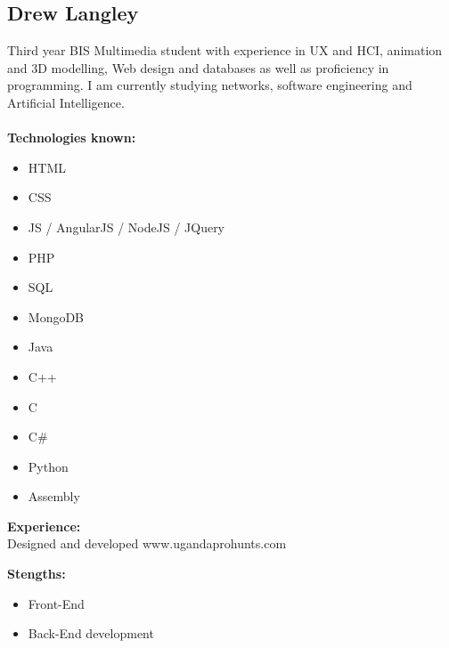 \documentclass{article}
\begin{document}
\subsection {Drew Langley}
Third year BIS Multimedia student with experience in UX and HCI, animation and 3D modelling, Web design and databases as well as proficiency in programming. I am currently studying networks, software engineering and Artificial Intelligence. \\ \\
\textbf{Technologies known:}
\begin{itemize}
	\item HTML
	\item CSS 
	\item JS / AngularJS / NodeJS / JQuery 
	\item PHP 
	\item SQL
	\item MongoDB
	\item Java 
	\item C++ 
	\item C 
	\item C\# 
	\item Python 
	\item Assembly
\end{itemize}
\textbf{Experience:} \\
Designed and developed www.ugandaprohunts.com

\textbf{Stengths:} 
\begin{itemize}
	\item Front-End
	\item Back-End development
\end{itemize}
\end{document}
